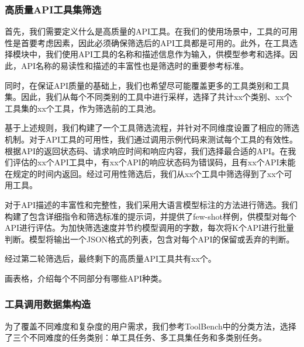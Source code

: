 \subsubsection{高质量API工具集筛选}

首先，我们需要定义什么是高质量的API工具。在我们的使用场景中，工具的可用性是首要考虑因素，因此必须确保筛选后的API工具都是可用的。此外，在工具选择模块中，我们使用API工具的名称和描述信息作为输入，供模型参考和选择。因此，API名称的易读性和描述的丰富性也是筛选时的重要参考标准。

同时，在保证API质量的基础上，我们也希望尽可能覆盖更多的工具类别和工具集。因此，我们从每个不同类别的工具中进行采样，选择了共计xx个类别、xx个工具集的xx个工具，作为筛选前的工具池。

基于上述规则，我们构建了一个工具筛选流程，并针对不同维度设置了相应的筛选机制。对于API工具的可用性，我们通过调用示例代码来测试每个工具的有效性。根据API的返回状态码、请求响应时间和响应内容，我们选择最合适的API。在我们评估的xx个API工具中，有xx个API的响应状态码为错误码，且有xx个API未能在规定的时间内返回。经过可用性筛选后，我们从xx个工具中筛选得到了xx个可用工具。

对于API描述的丰富性和完整性，我们采用大语言模型标注的方法进行筛选。我们构建了包含详细指令和筛选标准的提示词，并提供了few-shot样例，供模型对每个API进行评估。为加快筛选速度并节约模型调用的字数，每次将K个API进行批量判断。模型将输出一个JSON格式的列表，包含对每个API的保留或丢弃的判断。

经过第二轮筛选后，最终剩下的高质量API工具共有xx个。

画表格，介绍每个不同部分有哪些API种类。

\subsubsection{工具调用数据集构造}

为了覆盖不同难度和复杂度的用户需求，我们参考ToolBench中的分类方法，选择了三个不同难度的任务类别：单工具任务、多工具集任务和多类别任务。

